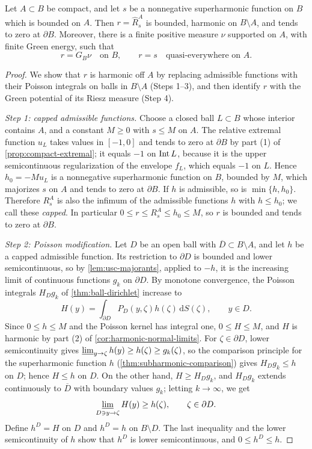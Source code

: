 \begin{theorem}\label{thm:compact-reduction}
Let $A\subset B$ be compact, and let $s$ be a nonnegative superharmonic function on $B$ which is bounded on $A$. Then $r=\widehat R_s^A$ is bounded, harmonic on $B\setminus A$, and tends to zero at $\partial B$. Moreover, there is a finite positive measure $\nu$ supported on $A$, with finite Green energy, such that
\[
 r=G_B\nu\quad\text{on }B,\qquad r=s\quad\text{quasi-everywhere on }A.
\]
\end{theorem}
\begin{proof}
We show that $r$ is harmonic off $A$ by replacing admissible functions with their Poisson integrals on balls in $B\setminus A$ (Steps 1--3), and then identify $r$ with the Green potential of its Riesz measure (Step 4).

\emph{Step 1: capped admissible functions.} Choose a closed ball $L\subset B$ whose interior contains $A$, and a constant $M\geq0$ with $s\leq M$ on $A$. The relative extremal function $u_L$ takes values in $[-1,0]$ and tends to zero at $\partial B$ by part (1) of \cref{prop:compact-extremal}; it equals $-1$ on $\operatorname{Int} L$, because it is the upper semicontinuous regularization of the envelope $f_L$, which equals $-1$ on $L$. Hence $h_0=-Mu_L$ is a nonnegative superharmonic function on $B$, bounded by $M$, which majorizes $s$ on $A$ and tends to zero at $\partial B$. If $h$ is admissible, so is $\min\{h,h_0\}$. Therefore $R_s^A$ is also the infimum of the admissible functions $h$ with $h\leq h_0$; we call these \emph{capped}. In particular $0\leq r\leq R_s^A\leq h_0\leq M$, so $r$ is bounded and tends to zero at $\partial B$.

\emph{Step 2: Poisson modification.} Let $D$ be an open ball with $\overline D\subset B\setminus A$, and let $h$ be a capped admissible function. Its restriction to $\partial D$ is bounded and lower semicontinuous, so by \cref{lem:usc-majorants}, applied to $-h$, it is the increasing limit of continuous functions $g_k$ on $\partial D$. By monotone convergence, the Poisson integrals $H_Dg_k$ of \cref{thm:ball-dirichlet} increase to
\[
 H(y)=\int_{\partial D}P_D(y,\zeta)h(\zeta)\,\mathrm d S(\zeta),\qquad y\in D.
\]
Since $0\leq h\leq M$ and the Poisson kernel has integral one, $0\leq H\leq M$, and $H$ is harmonic by part (2) of \cref{cor:harmonic-normal-limits}. For $\zeta\in\partial D$, lower semicontinuity gives $\varliminf_{y\to\zeta}h(y)\geq h(\zeta)\geq g_k(\zeta)$, so the comparison principle for the superharmonic function $h$ (\cref{thm:subharmonic-comparison}) gives $H_Dg_k\leq h$ on $D$; hence $H\leq h$ on $D$. On the other hand, $H\geq H_Dg_k$, and $H_Dg_k$ extends continuously to $\overline D$ with boundary values $g_k$; letting $k\to\infty$, we get
\[
 \varliminf_{D\ni y\to\zeta}H(y)\geq h(\zeta),\qquad\zeta\in\partial D.
\]
Define $h^D=H$ on $D$ and $h^D=h$ on $B\setminus D$. The last inequality and the lower semicontinuity of $h$ show that $h^D$ is lower semicontinuous, and $0\leq h^D\leq h$.


\end{proof}

